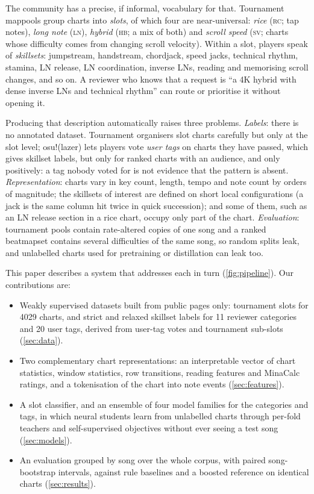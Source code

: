 \documentclass[10pt,twocolumn]{article}
\newcommand{\RC}{\textsc{rc}}
\newcommand{\LN}{\textsc{ln}}
\newcommand{\HB}{\textsc{hb}}
\newcommand{\SV}{\textsc{sv}}
\begin{document}
The community has a precise, if informal, vocabulary for that. Tournament mappools group charts into \emph{slots}, of which four are near-universal: \emph{rice} (\RC; tap notes), \emph{long note} (\LN), \emph{hybrid} (\HB; a mix of both) and \emph{scroll speed} (\SV; charts whose difficulty comes from changing scroll velocity). Within a slot, players speak of \emph{skillsets}: jumpstream, handstream, chordjack, speed jacks, technical rhythm, stamina, LN release, LN coordination, inverse LNs, reading and memorising scroll changes, and so on. A reviewer who knows that a request is ``a 4K hybrid with dense inverse LNs and technical rhythm'' can route or prioritise it without opening it.

Producing that description automatically raises three problems. \emph{Labels}: there is no annotated dataset. Tournament organisers slot charts carefully but only at the slot level; osu!(lazer) lets players vote \emph{user tags} on charts they have passed, which gives skillset labels, but only for ranked charts with an audience, and only positively: a tag nobody voted for is not evidence that the pattern is absent. \emph{Representation}: charts vary in key count, length, tempo and note count by orders of magnitude; the skillsets of interest are defined on short local configurations (a jack is the same column hit twice in quick succession); and some of them, such as an LN release section in a rice chart, occupy only part of the chart. \emph{Evaluation}: tournament pools contain rate-altered copies of one song and a ranked beatmapset contains several difficulties of the same song, so random splits leak, and unlabelled charts used for pretraining or distillation can leak too.

This paper describes a system that addresses each in turn (\cref{fig:pipeline}). Our contributions are:
\begin{itemize}\setlength\itemsep{1pt}
\item Weakly supervised datasets built from public pages only: tournament slots for \num{4029} charts, and strict and relaxed skillset labels for 11 reviewer categories and 20 user tags, derived from user-tag votes and tournament sub-slots (\cref{sec:data}).
\item Two complementary chart representations: an interpretable vector of chart statistics, window statistics, row transitions, reading features and MinaCalc ratings, and a tokenisation of the chart into note events (\cref{sec:features}).
\item A slot classifier, and an ensemble of four model families for the categories and tags, in which neural students learn from unlabelled charts through per-fold teachers and self-supervised objectives without ever seeing a test song (\cref{sec:models}).
\item An evaluation grouped by song over the whole corpus, with paired song-bootstrap intervals, against rule baselines and a boosted reference on identical charts (\cref{sec:results}).
\end{itemize}
\end{document}

